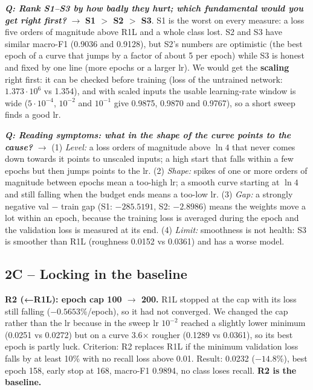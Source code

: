 \documentclass[9pt]{extarticle}
\newcommand{\Q}[1]{\textbf{\emph{Q: #1}}}
\newcommand{\run}[1]{\textsf{#1}}
\begin{document}
\Q{Rank S1--S3 by how badly they hurt; which fundamental would you get right first?} $\rightarrow$ \textbf{S1 $>$ S2 $>$ S3}. \run{S1} is the worst on every measure: a loss five orders of magnitude above \run{R1L} and a whole class lost. \run{S2} and \run{S3} have similar macro-F1 (0.9036 and 0.9128), but \run{S2}'s numbers are optimistic (the best epoch of a curve that jumps by a factor of about 5 per epoch) while \run{S3} is honest and fixed by one line (more epochs or a larger lr). We would get the \textbf{scaling} right first: it can be checked before training (loss of the untrained network: $1.373\cdot10^6$ vs 1.354), and with scaled inputs the usable learning-rate window is wide ($5\cdot10^{-4}$, $10^{-2}$ and $10^{-1}$ give 0.9875, 0.9870 and 0.9767), so a short sweep finds a good lr.

\Q{Reading symptoms: what in the shape of the curve points to the cause?} $\rightarrow$ (1) \emph{Level:} a loss orders of magnitude above $\ln 4$ that never comes down towards it points to unscaled inputs; a high start that falls within a few epochs but then jumps points to the lr. (2) \emph{Shape:} spikes of one or more orders of magnitude between epochs mean a too-high lr; a smooth curve starting at $\ln 4$ and still falling when the budget ends means a too-low lr. (3) \emph{Gap:} a strongly negative val $-$ train gap (\run{S1}: $-285.5191$, \run{S2}: $-2.8986$) means the weights move a lot within an epoch, because the training loss is averaged during the epoch and the validation loss is measured at its end. (4) \emph{Limit:} smoothness is not health: \run{S3} is smoother than \run{R1L} (roughness 0.0152 vs 0.0361) and has a worse model.

\subsection*{2C -- Locking in the baseline}
\textbf{\run{R2 (←R1L)}: epoch cap 100 $\rightarrow$ 200.} \run{R1L} stopped at the cap with its loss still falling ($-0.5653$\%/epoch), so it had not converged. We changed the cap rather than the lr because in the sweep lr $10^{-2}$ reached a slightly lower minimum (0.0251 vs 0.0272) but on a curve 3.6$\times$ rougher (0.1289 vs 0.0361), so its best epoch is partly luck. Criterion: \run{R2} replaces \run{R1L} if the minimum validation loss falls by at least 10\% with no recall loss above 0.01. Result: 0.0232 ($-14.8$\%), best epoch 158, early stop at 168, macro-F1 0.9894, no class loses recall. \textbf{\run{R2} is the baseline.}
\end{document}

